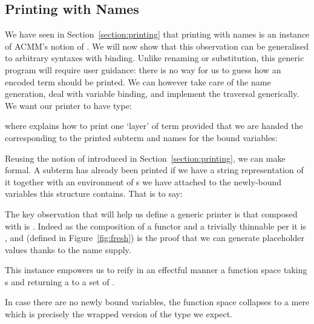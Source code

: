 
\subsection{Printing with Names}\label{section:genericprinting}

We have seen in Section~\ref{section:printing} that printing with names
is an instance of ACMM's notion of \semrec{}. We will now show that this
observation can be generalised to arbitrary syntaxes with binding. Unlike
renaming or substitution, this generic program will require user guidance:
there is no way for us to guess how an encoded term should be printed. We
can however take care of the name generation, deal with variable binding,
and implement the traversal generically. We want our printer to have type:


\noindent
where  explains how to print one `layer' of term provided that
we are handed the  corresponding to the printed subterm and
names for the bound variables:


Reusing the notion of  introduced in Section~\ref{section:printing},
we can make  formal. A subterm has already been printed if we
have a string representation of it together with an environment of s
we have attached to the newly-bound variables this structure contains.
That is to say:


The key observation that will help us define a generic printer is that
 composed with  is . Indeed as the composition
of a functor and a trivially thinnable per it is ,
and  (defined in Figure~\ref{fig:fresh}) is the proof that we
can generate placeholder values thanks to the name supply.


This  instance empowers us to reify in an effectful manner
a  function space taking s and returning a 
to a set of .


In case there are no newly bound variables, the  function space
collapses to a mere  which is precisely the wrapped version of
the type we expect.

